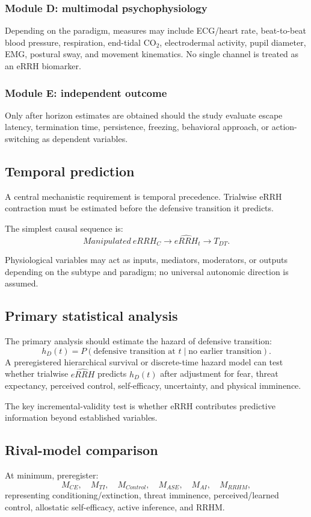 \documentclass[9pt,twocolumn]{article}
\begin{document}
\subsubsection{Module D: multimodal psychophysiology}
Depending on the paradigm, measures may include ECG/heart rate, beat-to-beat blood pressure, respiration, end-tidal CO$_2$, electrodermal activity, pupil diameter, EMG, postural sway, and movement kinematics. No single channel is treated as an eRRH biomarker.

\subsubsection{Module E: independent outcome}
Only after horizon estimates are obtained should the study evaluate escape latency, termination time, persistence, freezing, behavioral approach, or action-switching as dependent variables.

\subsection{Temporal prediction}
A central mechanistic requirement is temporal precedence. Trialwise eRRH contraction must be estimated before the defensive transition it predicts.

The simplest causal sequence is:
\[
Manipulated\ eRRH_C
\rightarrow
\widehat{eRRH}_t
\rightarrow
T_{DT}.
\]

Physiological variables may act as inputs, mediators, moderators, or outputs depending on the subtype and paradigm; no universal autonomic direction is assumed.

\subsection{Primary statistical analysis}
The primary analysis should estimate the hazard of defensive transition:
\[
h_D(t)=P(\text{defensive transition at }t\mid\text{no earlier transition}).
\]
A preregistered hierarchical survival or discrete-time hazard model can test whether trialwise $\widehat{eRRH}$ predicts $h_D(t)$ after adjustment for fear, threat expectancy, perceived control, self-efficacy, uncertainty, and physical imminence.

The key incremental-validity test is whether eRRH contributes predictive information beyond established variables.

\subsection{Rival-model comparison}
At minimum, preregister:
\[
M_{CE},\quad M_{TI},\quad M_{Control},\quad M_{ASE},\quad M_{AI},\quad M_{RRHM},
\]
representing conditioning/extinction, threat imminence, perceived/learned control, allostatic self-efficacy, active inference, and RRHM.
\end{document}
